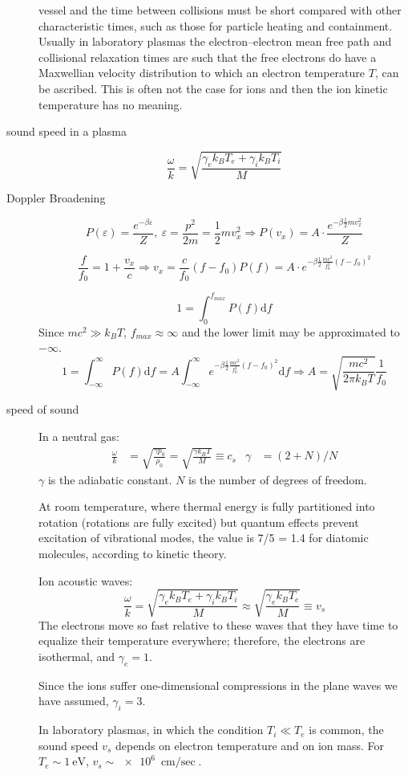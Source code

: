 \documentclass[openany]{book}
\begin{document}
\begin{description}
vessel and the time between collisions must be short compared with other characteristic times, such as those for particle heating and containment.
Usually in laboratory plasmas the electron--electron mean free path and collisional relaxation times are such that the free electrons do have a Maxwellian
velocity distribution to which an electron temperature $T$, can be ascribed.
This is often not the case for ions and then the ion kinetic temperature has no
meaning.
\item[sound speed in a plasma]
$$\frac{\omega}{k}=\sqrt{\frac{\gamma_e k_{B}T_{e}+\gamma_{i}k_{B}T_{i}}{M}}$$
\item[Doppler Broadening]
$$P\left(\varepsilon\right)=\frac{e^{-\beta\varepsilon}}{Z},\ \varepsilon=\frac{p^{2}}{2m}=\frac{1}{2}mv_{x}^{2}\Rightarrow P\left(v_{x}\right)=A\cdot\frac{e^{-\beta\frac{1}{2}mv_{x}^{2}}}{Z}$$

$$\frac{f}{f_{0}}=1+\frac{v_{x}}{c}\Rightarrow v_{x}=\frac{c}{f_{0}}\left(f-f_{0}\right)P\left(f\right)=A\cdot e^{-\beta\frac{1}{2}\frac{mc^{2}}{f_{0}^{2}}\left(f-f_{0}\right)^{2}}$$

$$1=\int_{0}^{f_{max}}P\left(f\right)\mathrm{d}f$$
Since $mc^{2}\gg k_{B}T$, $f_{max}\approx\infty$ and the lower limit may be approximated to $-\infty$.
$$1=\int_{-\infty}^{\infty}P\left(f\right)\mathrm{d}f=A\int_{-\infty}^{\infty}e^{-\beta\frac{1}{2}\frac{mc^{2}}{f_{0}^{2}}\left(f-f_{0}\right)^{2}}\mathrm{d}f\Rightarrow A=\sqrt{\frac{mc^{2}}{2\pi k_{B}T}}\frac{1}{f_{0}}$$
\item[speed of sound]
In a neutral gas:
\begin{align*}
  \frac{\omega}{k} &= \sqrt{\frac{\gamma p_{0}}{\rho_{0}}}=\sqrt{\frac{\gamma k_{B}T}{M}}\equiv c_{s} & \gamma &= (2+N)/N
\end{align*}
$\gamma$ is the adiabatic constant. $N$ is the number of degrees of freedom.

At room temperature, where thermal energy is fully partitioned into rotation (rotations are fully excited) but quantum effects prevent excitation of vibrational modes, the value is 7/5 = 1.4 for diatomic molecules, according to kinetic theory.

Ion acoustic waves:
$$\frac{\omega}{k}=\sqrt{\frac{\gamma_e k_B T_e+\gamma_i k_B T_i}{M}}\approx \sqrt{\frac{\gamma_e k_B T_e}{M}} \equiv v_{s}$$
The electrons move so fast relative to these waves that they have time to equalize their temperature everywhere; therefore, the electrons are isothermal, and $\gamma_e=1$.

Since the ions suffer one-dimensional compressions in the plane waves we have assumed, $\gamma_i=3$.

In laboratory plasmas, in which the condition $T_i\ll T_e$ is common, the sound speed $v_s$ depends on electron temperature and on ion mass. For $T_e\sim \SI{1}{\electronvolt}$, $v_s \sim \SI{e6}{\cm\per\sec}$.
\end{description}
\end{document}
